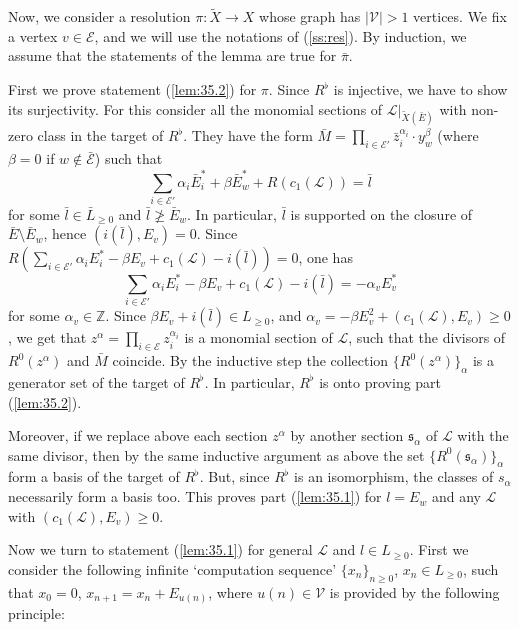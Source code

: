 \documentclass[10pt,a4paper]{amsart}
\numberwithin{equation}{section}
\numberwithin{equation}{subsection}
\theoremstyle{plain}
\theoremstyle{definition}
\begin{document}
 Now, we consider a resolution $\pi:\widetilde{X}\to X$
whose graph has $|{\mathcal{V}}|>1$ vertices. We fix a vertex $v\in{\mathcal{E}}$, and
we will use the notations of (\ref{ss:res}). By induction, we
assume that the statements of the lemma are true for $\bar{\pi}$.

First we prove statement (\ref{lem:35.2}) for $\pi$.
Since $R^\flat$ is injective, we have to show its surjectivity.
For this consider all the monomial sections of
${\mathcal{L}}|_{\widetilde{X}(\bar{E})}$ with non-zero class in the target of
$R^\flat$. They have the form
$\bar{M}=\prod_{i\in{\mathcal{E}}'}\bar{z}_i^{\alpha_i}\cdot y_w^\beta$
(where $\beta=0$ if $w\not\in \bar{\mathcal{E}}$) such that
\begin{equation*}\label{eq:3.10}
\sum_{i\in{\mathcal{E}}'}
\alpha_i\bar{E}_i^*+\beta\bar{E}_w^*+R(c_1({\mathcal{L}}))=\bar{l}
\end{equation*}
for some $\bar{l}\in \bar{L}_{\geq 0}$ and $\bar{l}\not\geq
\bar{E}_w$. In particular, $\bar{l}$ is supported on the closure
of $\bar{E}\setminus \bar{E}_w$, hence  $(i(\bar{l}),E_v)=0$.
Since
$R(\sum_{i\in{\mathcal{E}}'} \alpha_iE^*_i-\beta
E_v+c_1({\mathcal{L}})-i(\bar{l}))=0$,
one has
\begin{equation}\label{eq:3.12}
\sum_{i\in{\mathcal{E}}'} \alpha_iE^*_i-\beta
E_v+c_1({\mathcal{L}})-i(\bar{l})=-\alpha_v E_v^*
\end{equation}
for some $\alpha_v\in {\mathbb{Z}}$. Since  $\beta E_v+i(\bar{l})\in
L_{\geq 0}$, and $\alpha_v=-\beta E^2_v+(c_1({\mathcal{L}}),E_v)\geq
0$, we get that
$z^\alpha=\prod_{i\in{\mathcal{E}}}z_i^{\alpha_i}$ is a monomial section of
${\mathcal{L}}$, such that the divisors of $R^0(z^\alpha)$ and
$\bar{M}$ coincide. By the inductive step the collection
$\{R^0(z^\alpha)\}_\alpha$ is a generator set of the target of
$R^\flat$. In particular, $R^\flat$ is onto proving part
(\ref{lem:35.2}).

Moreover, if we replace above each section $z^\alpha$ by another
section ${\mathfrak{s}}_\alpha$ of ${\mathcal{L}}$ with the same divisor, then
by the same inductive argument as above the set
$\{R^0({\mathfrak{s}}_\alpha)\}_\alpha$ form a basis of the target of
$R^\flat$. But, since  $R^\flat$ is an isomorphism, the classes of
$s_\alpha$ necessarily form a basis too. This proves part
(\ref{lem:35.1}) for $l=E_w$ and any ${\mathcal{L}}$ with
$(c_1({\mathcal{L}}),E_v)\geq 0$.

Now we turn to statement (\ref{lem:35.1}) for general
${\mathcal{L}}$ and $l\in L_{\geq 0}$. First we consider the
following infinite `computation sequence' $\{x_n\}_{n\geq 0}$,
$x_n\in L_{\geq 0}$, such that $x_0=0$, $x_{n+1}=x_n+E_{u(n)}$,
where $u(n)\in{\mathcal{V}}$ is provided by the following principle:
\end{document}
